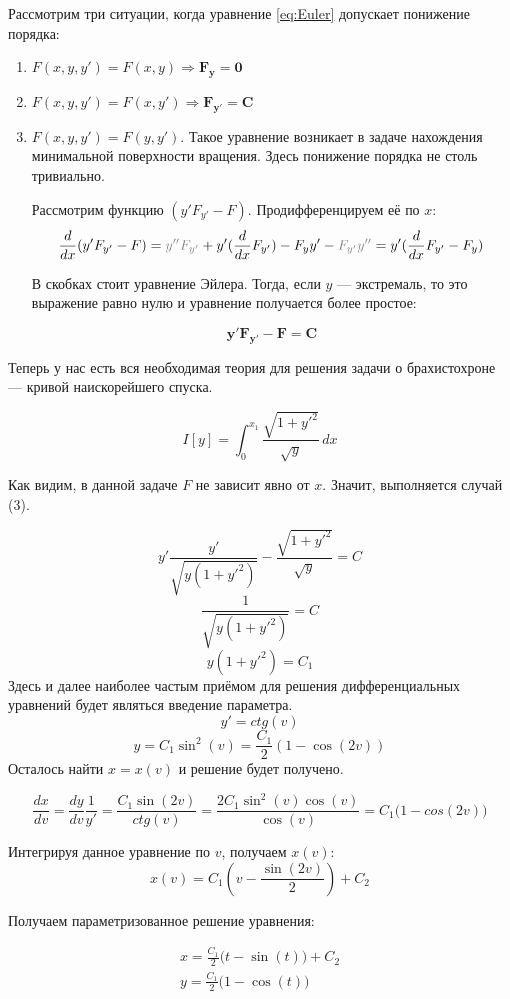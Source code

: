 \documentclass[12pt]{article}
\begin{document}
	Рассмотрим три ситуации, когда уравнение \ref{eq:Euler} допускает понижение порядка:
	\begin{enumerate}
			\item $F(x,y,y') = F(x,y)  \Rightarrow \mathbf{F_y = 0}$
			\item $F(x,y,y') = F(x,y') \Rightarrow \mathbf{F_{y'} = C}$
			\item $F(x,y,y') = F(y,y')$. Такое уравнение возникает в задаче нахождения минимальной поверхности вращения.
			Здесь понижение порядка не столь тривиально.
			
			Рассмотрим функцию $(y'F_{y'} - F)$. Продифференцируем её по $x$:
			$$\frac{d}{dx}(y'F_{y'} - F) =
			  \off{y''F_{y'}} + y'(\frac{d}{dx}F_{y'}) - F_yy' - \off{F_{y'}y''} = 
			  y'(\frac{d}{dx}F_{y'} - F_y)$$
			
			В скобках стоит уравнение Эйлера. Тогда, если $y$ --- экстремаль, то это выражение равно нулю и уравнение 
			получается более простое:
			
			$$\mathbf{y'F_{y'} - F = C}$$
	\end{enumerate}
	
	Теперь у нас есть вся необходимая теория для решения задачи о брахистохроне --- кривой наискорейшего спуска.
	
	$$I[y] = \int_0^{x_1} \frac{\sqrt{1+y'^2}}{\sqrt{y}} \,dx$$
	
	Как видим, в данной задаче $F$ не зависит явно от $x$. Значит, выполняется случай (3).
	
	$$y'\frac{y'}{\sqrt{y(1+y'^2)}} - \frac{\sqrt{1+y'^2}}{\sqrt{y}} = C$$
	$$\frac{1}{\sqrt{y(1+y'^2)}} = C$$
	$$y(1+y'^2) = C_1$$
	Здесь и далее наиболее частым приёмом для решения дифференциальных уравнений будет являться введение параметра.
	$$y' = ctg(v)$$
	$$y = C_1 \sin^2(v) = \frac{C_1}{2}(1 - \cos(2v))$$
	Осталось найти $x = x(v)$ и решение будет получено.
	
	$$\frac{dx}{dv} = \frac{dy}{dv} \frac{1}{y'} = 
	  \frac{C_1\sin(2v)}{ctg(v)} = \frac{2C_1 \sin^2(v)\cos(v)}{\cos(v)} = C_1\big(1 - cos(2v)\big)$$
	  
	Интегрируя данное уравнение по $v$, получаем $x(v)$:
	$$x(v) = C_1\left(v - \frac{\sin(2v)}{2}\right) + C_2$$
	
	Получаем параметризованное решение уравнения:
	
	\begin{align*}
			x = \frac{C_1}{2} \big(t - \sin(t)\big) + C_2 \\
			y = \frac{C_1}{2} \big(1 - \cos(t)\big)
	\end{align*}
	
\end{document}
